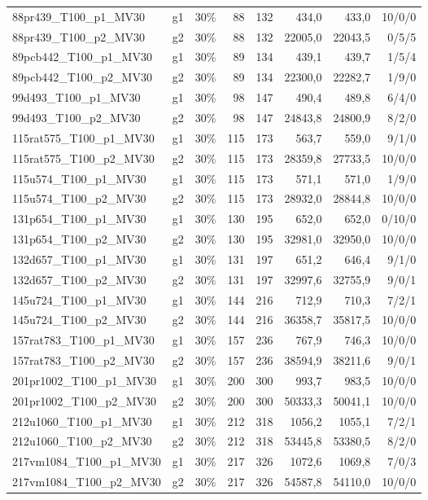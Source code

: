 \begin{longtable}{llrrrrrr}
88pr439\_T100\_p1\_MV30 & g1 & 30\% & 88 & 132 & 434{,}0 & 433{,}0 & 10/0/0 \\
88pr439\_T100\_p2\_MV30 & g2 & 30\% & 88 & 132 & 22005{,}0 & 22043{,}5 & 0/5/5 \\
89pcb442\_T100\_p1\_MV30 & g1 & 30\% & 89 & 134 & 439{,}1 & 439{,}7 & 1/5/4 \\
89pcb442\_T100\_p2\_MV30 & g2 & 30\% & 89 & 134 & 22300{,}0 & 22282{,}7 & 1/9/0 \\
99d493\_T100\_p1\_MV30 & g1 & 30\% & 98 & 147 & 490{,}4 & 489{,}8 & 6/4/0 \\
99d493\_T100\_p2\_MV30 & g2 & 30\% & 98 & 147 & 24843{,}8 & 24800{,}9 & 8/2/0 \\
115rat575\_T100\_p1\_MV30 & g1 & 30\% & 115 & 173 & 563{,}7 & 559{,}0 & 9/1/0 \\
115rat575\_T100\_p2\_MV30 & g2 & 30\% & 115 & 173 & 28359{,}8 & 27733{,}5 & 10/0/0 \\
115u574\_T100\_p1\_MV30 & g1 & 30\% & 115 & 173 & 571{,}1 & 571{,}0 & 1/9/0 \\
115u574\_T100\_p2\_MV30 & g2 & 30\% & 115 & 173 & 28932{,}0 & 28844{,}8 & 10/0/0 \\
131p654\_T100\_p1\_MV30 & g1 & 30\% & 130 & 195 & 652{,}0 & 652{,}0 & 0/10/0 \\
131p654\_T100\_p2\_MV30 & g2 & 30\% & 130 & 195 & 32981{,}0 & 32950{,}0 & 10/0/0 \\
132d657\_T100\_p1\_MV30 & g1 & 30\% & 131 & 197 & 651{,}2 & 646{,}4 & 9/1/0 \\
132d657\_T100\_p2\_MV30 & g2 & 30\% & 131 & 197 & 32997{,}6 & 32755{,}9 & 9/0/1 \\
145u724\_T100\_p1\_MV30 & g1 & 30\% & 144 & 216 & 712{,}9 & 710{,}3 & 7/2/1 \\
145u724\_T100\_p2\_MV30 & g2 & 30\% & 144 & 216 & 36358{,}7 & 35817{,}5 & 10/0/0 \\
157rat783\_T100\_p1\_MV30 & g1 & 30\% & 157 & 236 & 767{,}9 & 746{,}3 & 10/0/0 \\
157rat783\_T100\_p2\_MV30 & g2 & 30\% & 157 & 236 & 38594{,}9 & 38211{,}6 & 9/0/1 \\
201pr1002\_T100\_p1\_MV30 & g1 & 30\% & 200 & 300 & 993{,}7 & 983{,}5 & 10/0/0 \\
201pr1002\_T100\_p2\_MV30 & g2 & 30\% & 200 & 300 & 50333{,}3 & 50041{,}1 & 10/0/0 \\
212u1060\_T100\_p1\_MV30 & g1 & 30\% & 212 & 318 & 1056{,}2 & 1055{,}1 & 7/2/1 \\
212u1060\_T100\_p2\_MV30 & g2 & 30\% & 212 & 318 & 53445{,}8 & 53380{,}5 & 8/2/0 \\
217vm1084\_T100\_p1\_MV30 & g1 & 30\% & 217 & 326 & 1072{,}6 & 1069{,}8 & 7/0/3 \\
217vm1084\_T100\_p2\_MV30 & g2 & 30\% & 217 & 326 & 54587{,}8 & 54110{,}0 & 10/0/0 \\
\end{longtable}
\normalsize

